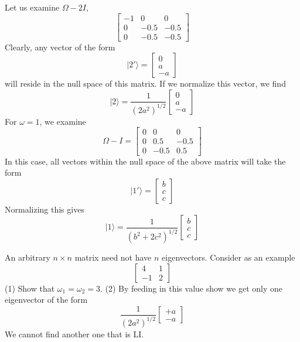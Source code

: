 \documentclass[../principles-of-quantum-mechanics.tex]{subfiles}
\begin{document}
\begin{questions}
\begin{solution}
	Let us examine $\Omega - 2{I}$,
	\[
		\begin{bmatrix}
			-1 & 0 & 0 \\ 0 & -0.5 & -0.5 \\ 0 & -0.5 & -0.5
		\end{bmatrix}
	\]
	Clearly, any vector of the form
	\[
		|2'\rangle = \begin{bmatrix}0 \\ a \\ -a\end{bmatrix}
	\]
	will reside in the null space of this matrix. If we normalize this vector, we find
	\[
		|2\rangle = \frac{1}{(2a^2)^{1/2}}\begin{bmatrix}0 \\ a \\ -a\end{bmatrix}
	\]
	For $\omega = 1$, we examine
	\[
		\Omega - I = \begin{bmatrix} 0 & 0 & 0 \\ 0 & 0.5 & -0.5 \\ 0 & -0.5 & 0.5 \end{bmatrix}
	\]
	In this case, all vectors within the null space of the above matrix will take the form
	\[
		|1'\rangle = \begin{bmatrix}b \\ c \\ c\end{bmatrix}
	\]
	Normalizing this gives
	\[
		|1\rangle = \frac{1}{(b^2 + 2c^2)^{1/2}}\begin{bmatrix}b \\ c \\ c\end{bmatrix}
	\]
\end{solution}

\question An arbitrary $n\times{n}$ matrix need not have $n$ eigenvectors. Consider as an example
\[
\begin{bmatrix}4 & 1 \\ -1 & 2\end{bmatrix}
\]
(1) Show that $\omega_1=\omega_2=3$.
(2) By feeding in this value show we get only one eigenvector of the form
\[
	\frac{1}{(2a^2)^{1/2}}\begin{bmatrix}+a \\ -a\end{bmatrix}
\]
We cannot find another one that is LI.


\end{questions}
\end{document}
